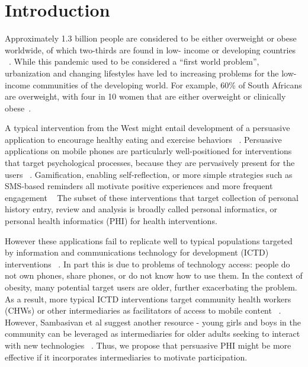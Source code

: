 \documentclass{sig-alternate}
\begin{document}
\section{Introduction} Approximately 1.3 billion people are considered to be
either overweight or obese worldwide, of which two-thirds are found in low-
income or developing countries ~\cite{Steyn2006}. While this pandemic used to
be considered a ``first world problem'', urbanization and changing lifestyles
have led to increasing problems for the low-income communities of the
developing world. For example, 60\% of South Africans are overweight, with
four in 10 women that are either overweight or clinically
obese~\cite{ng:global}.

A typical intervention from the West might entail development of a persuasive
application to encourage healthy eating and exercise behaviors
~\cite{arsand:mobile,hamari2014persuasive}.  Persuasive applications on mobile
phones are particularly well-positioned for interventions that target
psychological processes, because they are pervasively present for the users
~\cite{hsu2014persuasive}. Gamification, enabling self-reflection, or more
simple strategies such as SMS-based reminders all motivate positive
experiences and more frequent engagement
~\cite{hamari2014persuasive,cole2010text} The subset of these interventions
that target collection of personal history entry, review and analysis is
broadly called personal informatics, or personal health informatics (PHI) for
health interventions.

However these applications fail to replicate well to typical populations
targeted by information and communications technology for development (ICTD)
interventions ~\cite{kaplan2006can}. In part this is due to problems of
technology access: people do not own phones, share phones, or do not know how
to use them.  In the context of obesity, many potential target users are
older, further exacerbating the problem. As a result, more typical ICTD
interventions target community health workers (CHWs) or other intermediaries
as facilitators of access to mobile content
~\cite{ramachandran2010mobile,ramachandran2010research,molapo2013software}.
However, Sambasivan et al suggest another resource - young girls and boys in
the community can be leveraged as intermediaries for older adults seeking to
interact with new technologies ~\cite{sambasivan2010}. Thus, we propose that
persuasive PHI might be more effective if it incorporates intermediaries to
motivate participation.
\end{document}
